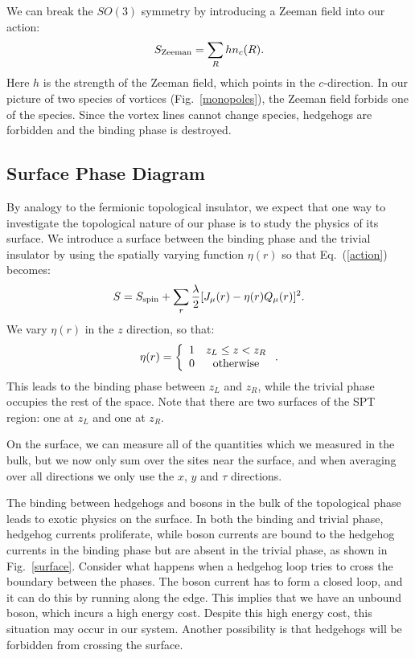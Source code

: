 \documentclass[prb,twocolumn]{revtex4-1}
\begin{document}
We can break the $SO(3)$ symmetry by introducing a Zeeman field into our action:
\begin{equation}
S_{\rm Zeeman}=\sum_R h n_c(R).
\label{Zeeman}
\end{equation}
Here $h$ is the strength of the Zeeman field, which points in the $c$-direction. In our picture of two species of vortices (Fig.~\ref{monopoles}), the Zeeman field forbids one of the species. Since the vortex lines cannot change species, hedgehogs are forbidden and the binding phase is destroyed. 

\subsection{Surface Phase Diagram}
\label{subsec:heissurf}
By analogy to the fermionic topological insulator, we expect that one way to investigate the topological nature of our phase is to study the physics of its surface. 
We introduce a surface between the binding phase and the trivial insulator by using the spatially varying function $\eta(r)$ so that Eq.~(\ref{action}) becomes:
\begin{equation}
S=S_{\rm spin}+\sum_r \frac{\lambda}{2}[J_\mu(r)-\eta(r) Q_\mu(r)]^2.
\end{equation}
We vary $\eta(r)$ in the $z$ direction, so that:
\begin{equation}
\eta(r)=
\left\{ \begin{array}{cc}
1 & z_L\leq z<z_R\\
0 & \rm{otherwise}\\
\end{array}\right..
\end{equation}
This leads to the binding phase between $z_L$ and $z_R$, while the trivial phase occupies the rest of the space. Note that there are two surfaces of the SPT region: one at $z_L$ and one at $z_R$.

On the surface, we can measure all of the quantities which we measured in the bulk, but we now only sum over the sites near the surface, and when averaging over all directions we only use the $x$, $y$ and $\tau$ directions. 

The binding between hedgehogs and bosons in the bulk of the topological phase leads to exotic physics on the surface. In both the binding and trivial phase, hedgehog currents proliferate, while boson currents are bound to the hedgehog currents in the binding phase but are absent in the trivial phase, as shown in Fig.~\ref{surface}. Consider what happens when a hedgehog loop tries to cross the boundary between the phases. The boson current has to form a closed loop, and it can do this by running along the edge. This implies that we have an unbound boson, which incurs a high energy cost. Despite this high energy cost, this situation may occur in our system. Another possibility is that hedgehogs will be forbidden from crossing the surface.
\end{document}
